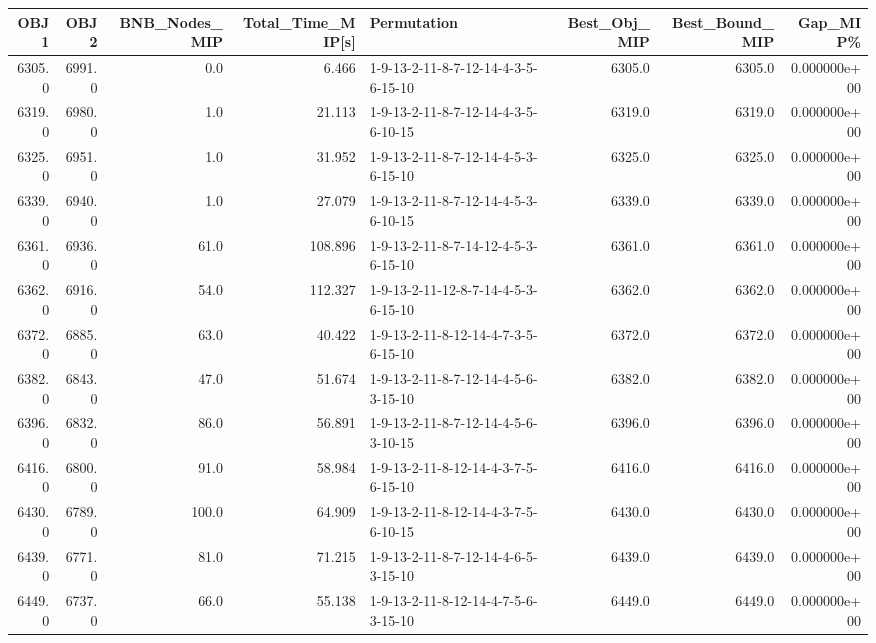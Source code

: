\begin{tabular}{rrrrlrrr}
\toprule
   OBJ1 &    OBJ2 &  BNB\_Nodes\_MIP &  Total\_Time\_MIP[s] &                          Permutation &  Best\_Obj\_MIP &  Best\_Bound\_MIP &      Gap\_MIP\% \\
\midrule
 6305.0 &  6991.0 &            0.0 &              6.466 &  1-9-13-2-11-8-7-12-14-4-3-5-6-15-10 &        6305.0 &          6305.0 &  0.000000e+00 \\
 6319.0 &  6980.0 &            1.0 &             21.113 &  1-9-13-2-11-8-7-12-14-4-3-5-6-10-15 &        6319.0 &          6319.0 &  0.000000e+00 \\
 6325.0 &  6951.0 &            1.0 &             31.952 &  1-9-13-2-11-8-7-12-14-4-5-3-6-15-10 &        6325.0 &          6325.0 &  0.000000e+00 \\
 6339.0 &  6940.0 &            1.0 &             27.079 &  1-9-13-2-11-8-7-12-14-4-5-3-6-10-15 &        6339.0 &          6339.0 &  0.000000e+00 \\
 6361.0 &  6936.0 &           61.0 &            108.896 &  1-9-13-2-11-8-7-14-12-4-5-3-6-15-10 &        6361.0 &          6361.0 &  0.000000e+00 \\
 6362.0 &  6916.0 &           54.0 &            112.327 &  1-9-13-2-11-12-8-7-14-4-5-3-6-15-10 &        6362.0 &          6362.0 &  0.000000e+00 \\
 6372.0 &  6885.0 &           63.0 &             40.422 &  1-9-13-2-11-8-12-14-4-7-3-5-6-15-10 &        6372.0 &          6372.0 &  0.000000e+00 \\
 6382.0 &  6843.0 &           47.0 &             51.674 &  1-9-13-2-11-8-7-12-14-4-5-6-3-15-10 &        6382.0 &          6382.0 &  0.000000e+00 \\
 6396.0 &  6832.0 &           86.0 &             56.891 &  1-9-13-2-11-8-7-12-14-4-5-6-3-10-15 &        6396.0 &          6396.0 &  0.000000e+00 \\
 6416.0 &  6800.0 &           91.0 &             58.984 &  1-9-13-2-11-8-12-14-4-3-7-5-6-15-10 &        6416.0 &          6416.0 &  0.000000e+00 \\
 6430.0 &  6789.0 &          100.0 &             64.909 &  1-9-13-2-11-8-12-14-4-3-7-5-6-10-15 &        6430.0 &          6430.0 &  0.000000e+00 \\
 6439.0 &  6771.0 &           81.0 &             71.215 &  1-9-13-2-11-8-7-12-14-4-6-5-3-15-10 &        6439.0 &          6439.0 &  0.000000e+00 \\
 6449.0 &  6737.0 &           66.0 &             55.138 &  1-9-13-2-11-8-12-14-4-7-5-6-3-15-10 &        6449.0 &          6449.0 &  0.000000e+00 \\

\end{tabular}
